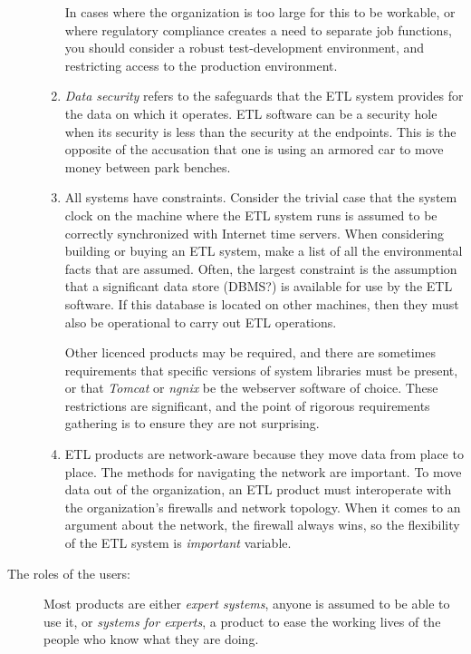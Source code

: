 \documentclass[11pt,letterpaper,twosided]{memoir}
\begin{document}
\begin{description}
\begin{enumerate}
In cases where the organization is too large for this to be
workable, or where regulatory compliance creates a need to separate
job functions, you should consider a robust test-development 
environment, and restricting access to the production 
environment.

\item \emph{Data security} refers to the safeguards that the
ETL system provides for the data on which it operates. ETL
software can be a security hole when its security is less than
the security at the endpoints. This is the opposite of the 
accusation that one is using an armored car to move money between
park benches.

\item All systems have constraints. Consider the trivial case
that the system clock on the machine where the ETL system runs
is assumed to be correctly synchronized with Internet time 
servers. When considering building or buying an ETL system,
make a list of all the environmental facts that are assumed.
Often, the largest constraint is the assumption that a 
significant data store (DBMS?) is available for use by the
ETL software. If this database is located on other machines,
then they must also be operational to carry out ETL operations.

Other licenced products may be required, and there are sometimes
requirements that specific versions of system libraries must
be present, or that \emph{Tomcat} or \emph{ngnix} be the webserver
software of choice. These restrictions are significant, and the
point of rigorous requirements gathering is to ensure they 
are not surprising. 

\item ETL products are network-aware because they move data
from place to place. The methods for navigating the network
are important. To move data out of the organization, an ETL 
product must interoperate with the organization's firewalls
and network topology. When it comes to an argument about 
the network, the firewall always wins, so the flexibility of the
ETL system is \emph{important} variable.

\end{enumerate}

\item[The roles of the users:] Most products are either \emph{expert
systems}, anyone is assumed to be able to use it, or \emph{systems for
experts}, a product to ease the working lives of the people who know
what they are doing.


\end{description}
\end{document}
